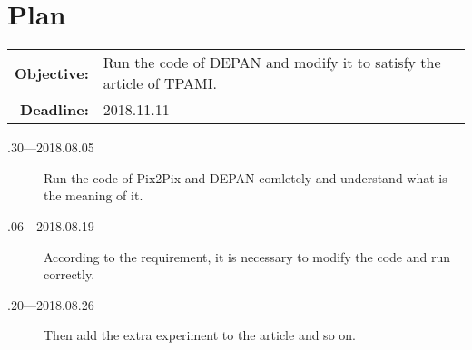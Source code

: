 \documentclass[a4paper]{article}
\begin{document}
\section{Plan}

\begin{tabular}{rl}
	\textbf{Objective:} & Run the code of DEPAN and modify it to satisfy the article of TPAMI. \\
    \textbf{Deadline:} & 2018.11.11
\end{tabular}

\begin{description}
    \item[.30---2018.08.05] Run the code of Pix2Pix and DEPAN comletely and understand what is the meaning of it.
    \item[.06---2018.08.19] According to the requirement, it is necessary to modify the code and run correctly.
    \item[.20---2018.08.26] Then add the extra experiment to the article and so on.
\end{description}



\end{document}
